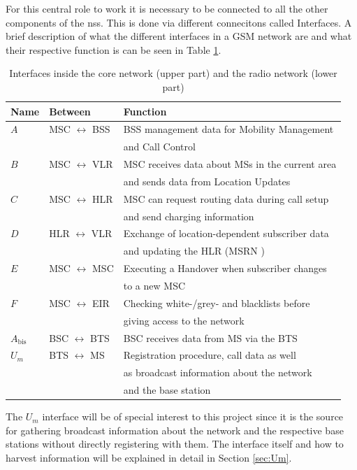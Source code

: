 For this central role to work it is necessary to be connected to all the other components of the \gls{nss}.
This is done via different connecitons called Interfaces.
A brief description of what the different interfaces in a GSM network are and what their respective function is can be seen in Table \ref{tab:interfaces}.

\begin{table}
\centering
\begin{tabular}{lll}
\toprule
Name			&Between					&Function\\
\midrule
$A$				&MSC $\leftrightarrow$ BSS	&BSS management data for Mobility Management\\
				&							&and Call Control\\
$B$				&MSC $\leftrightarrow$ VLR	&MSC receives data about MSs in the current area\\
				&							& and sends data from Location Updates\\
$C$				&MSC $\leftrightarrow$ HLR	&MSC can request routing data during call setup\\
				&							&and send \eg charging information\\
$D$				&HLR $\leftrightarrow$ VLR	&Exchange of location-dependent subscriber data\\
				&							&and updating the HLR (MSRN \etc)\\
$E$				&MSC $\leftrightarrow$ MSC	&Executing a Handover when subscriber changes\\
				&							&to a new MSC\\
$F$				&MSC $\leftrightarrow$ EIR	&Checking white-/grey- and blacklists before\\
				&							&giving access to the network\\
\midrule
$A_\text{bis}$	&BSC $\leftrightarrow$ BTS	&BSC receives data from MS via the BTS\\
$U_m$			&BTS $\leftrightarrow$ MS	&Registration procedure, call data \etc as well\\
				&							&as broadcast information about the network\\
				&							&and the base station\\
\bottomrule
\end{tabular}
\caption{Interfaces inside the core network (upper part) and the radio network (lower part)}
\label{tab:interfaces}
\end{table}

The $U_m$ interface will be of special interest to this project since it is the source for gathering broadcast information about the network and the respective base stations without directly registering with them.
The interface itself and how to harvest information will be explained in detail in Section \ref{sec:Um}.

